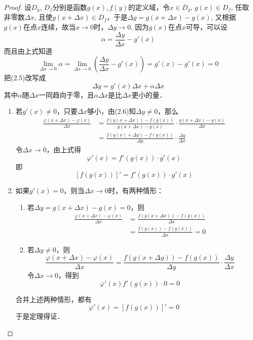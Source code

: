 \begin{proof}
    设$D_g$, $D_f$分别是函数$g(x),f(y)$的定义域，令$x\in D_g$, $g(x)\in D_f$, 任取非零数$\Delta x$, 且使$g(x+\Delta x)\in D_f$，于是$\Delta g=g(x+\Delta x)-g(x)$, 又根据$g(x)$在点$x$连续，故当$x\to 0$时，$\Delta y\to 0$. 因为$g(x)$在点$x$可导，可以设
\begin{equation}
    \alpha=\frac{\Delta y}{\Delta x}-g'(x)
\end{equation}
而且由上式知道
\[\lim_{\Delta x\to 0}\alpha=\lim_{\Delta x\to 0}\left(\frac{\Delta y}{\Delta x}-g'(x)\right)=g'(x)-g'(x)=0\]
把(2.5)改写成
\begin{equation}
    \Delta y=g'(x)\Delta x+\alpha\Delta x
\end{equation}
其中$\alpha$随$\Delta x$一同趋向于零，且$\alpha \Delta x$是比$\Delta x$更小的量．

\begin{enumerate}
    \item 若$g'(x)\ne 0$，只要$\Delta x$够小，由(2.6)知$\Delta y\ne 0$，那么
\begin{align*}
    \frac{\varphi(x+\Delta x)-\varphi(x)}{\Delta x}&=\frac{f(g(x+\Delta x))-f(g(x))}{g(x+\Delta x)-g(x)}\cdot \frac{g(x+\Delta x)-g(x)}{\Delta x}\\
    &=\frac{f(g(x)+\Delta y)-f(g(x))}{\Delta y}\cdot \frac{\Delta y}{\Delta x}
\end{align*}
令$\Delta x\to 0$，由上式得
\[\varphi'(x)=f'(g(x))\cdot g'(x)\]
即
\[[f(g(x))]'=f'(g(x))\cdot g'(x)\]

\item 如果$g'(x)=0$，则当$\Delta x\to 0$时，有两种情形：
\begin{enumerate}
    \item 若$\Delta y=g(x+\Delta x)-g(x)=0$，则
\begin{align*}
    \frac{\varphi(x+\Delta x)-\varphi(x)}{\Delta x}&=\frac{f(g(x+\Delta x))-f(g(x))}{\Delta x}\\
    &=\frac{f(g(x))-f(g(x))}{\Delta x}=0
\end{align*}
\item 若$\Delta y\ne 0$，则
\[\frac{\varphi(x+\Delta x)-\varphi(x)}{\Delta x}=\frac{f(g(x+\Delta y))-f(g(x))}{\Delta y}\cdot \frac{\Delta y}{\Delta x}\]
令$\Delta x\to 0$，得到
\[\varphi'(x)f'(g(x))\cdot 0=0\]
\end{enumerate}
合并上述两种情形，都有
\[\varphi'(x)=[f(g(x))]'=0\]
于是定理得证．
\end{enumerate}
\end{proof}

